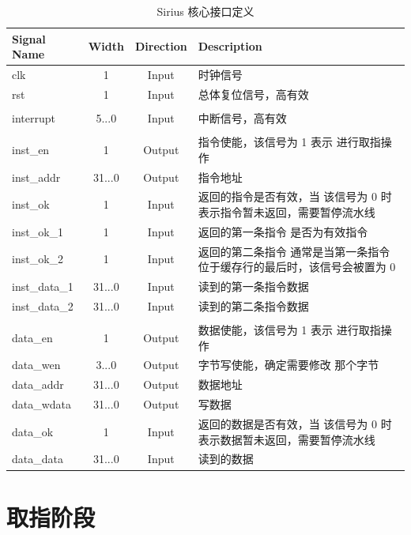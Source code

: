 \documentclass[blue,normal,cn,hide]{elegantbook}
\begin{document}
\begin{table}
    \renewcommand\arraystretch{1.25}
    \centering
    \begin{tabular}{lccm{}}
        \toprule 
        \rowcolor{black!20} \textbf{Signal Name} & \textbf{Width} & \textbf{Direction} & \textbf{Description} \\
        \midrule
        clk & 1 & Input & 时钟信号 \\
        rst & 1 & Input & 总体复位信号，高有效 \\
        \\
        interrupt & 5...0 & Input & 中断信号，高有效 \\
        \\
        inst\_en & 1 & Output & 指令使能，该信号为 1 表示
        进行取指操作 \\
        inst\_addr & 31...0 & Output & 指令地址 \\
        inst\_ok & 1 & Input & 返回的指令是否有效，当
        该信号为 0 时表示指令暂未返回，需要暂停流水线 \\
        inst\_ok\_1 & 1 & Input & 返回的第一条指令
        是否为有效指令 \\
        inst\_ok\_2 & 1 & Input & 返回的第二条指令
        通常是当第一条指令位于缓存行的最后时，该信号会被置为 0 \\
        inst\_data\_1 & 31...0 & Input & 读到的第一条指令数据 \\
        inst\_data\_2 & 31...0 & Input & 读到的第二条指令数据 \\
        \\
        data\_en & 1 & Output & 数据使能，该信号为 1 表示
        进行取指操作 \\
        data\_wen & 3...0 & Output & 字节写使能，确定需要修改
        那个字节 \\
        data\_addr & 31...0 & Output & 数据地址 \\
        data\_wdata & 31...0 & Output & 写数据 \\
        data\_ok & 1 & Input & 返回的数据是否有效，当
        该信号为 0 时表示数据暂未返回，需要暂停流水线 \\
        data\_data & 31...0 & Input & 读到的数据 \\
        \bottomrule
    \end{tabular}
    \caption{Sirius 核心接口定义}
    \label{tab:SiriusCoreInterface}
\end{table}

\section{取指阶段}
\end{document}
